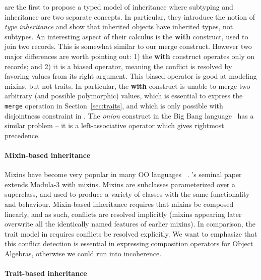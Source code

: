 \citet{cook1989inheritance} are the first to propose a typed model of
inheritance where subtyping and inheritance are two separate concepts. In
particular, they introduce the notion of \textit{type inheritance} and show that
inherited objects have inherited types, not subtypes. An interesting aspect of
their calculus is the \textbf{with} construct, used to join two records. This is
somewhat similar to our merge construct. However two major differences are worth
pointing out: 1) the \textbf{with} construct operates only on records; and 2) it
is a biased operator, meaning the conflict is resolved by favoring values from
its right argument. This biased operator is good at modeling mixins, but not
traits. In particular, the \textbf{with} construct is unable to merge two
arbitrary (and possible polymorphic) values, which is essential to express the
\lstinline{merge} operation in Section~\ref{sec:traits}, and which is only
possible with disjointness constraint in \name. The \textit{onion} construct in
the Big Bang language~\cite{palmer2015building,menon2012big} has a similar
problem -- it is a left-associative operator which gives rightmost precedence.



\paragraph{Mixin-based inheritance}

Mixins have become very popular in many OO languages
~\cite{flatt1998classes,bono1999core, ancona2003jam}. \citeauthor{bracha1990mixin}'s
seminal paper~\citep{bracha1990mixin} extends Modula-3 with mixins. Mixins are subclasses parameterized
over a superclass, and used to produce a variety of classes with the same
functionality and behaviour. Mixin-based inheritance requires that mixins be
composed linearly, and as such, conflicts are resolved implicitly (mixins
appearing later overwrite all the identically named features of earlier mixins).
In comparison, the trait model in \name requires conflicts be resolved
explicitly. We want to emphasize that this conflict detection is essential in
expressing composition operators for Object Algebras, otherwise we could run
into incoherence.


\paragraph{Trait-based inheritance}

